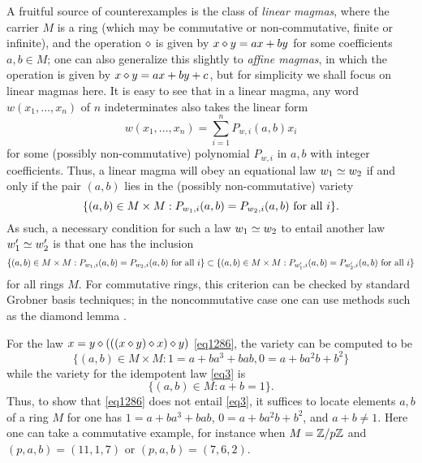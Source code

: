 A fruitful source of counterexamples is the class of \emph{linear magmas}, where the carrier $M$ is a ring (which may be commutative or non-commutative, finite or infinite), and the operation $\diamond$ is given by $x \diamond y = ax + by$ for some coefficients $a,b \in M$; one can also generalize this slightly to \emph{affine magmas}, in which the operation is given by $x \diamond y = ax + by + c$, but for simplicity we shall focus on linear magmas here.  It is easy to see that in a linear magma, any word $w(x_1,\dots,x_n)$ of $n$ indeterminates also takes the linear form
$$ w(x_1,\dots,x_n) = \sum_{i=1}^n P_{w,i}(a,b) x_i$$
for some (possibly non-commutative) polynomial $P_{w,i}$ in $a,b$ with integer coefficients.  Thus, a linear magma will obey an equational law $w_1 \simeq w_2$ if and only if the pair $(a,b)$ lies in the (possibly non-commutative) variety
\begin{equation}\label{variety}
  \{ (a,b) \in M \times M: P_{w_1,i}(a,b) = P_{w_2,i}(a,b) \hbox{ for all } i \}.
\end{equation}
As such, a necessary condition for such a law $w_1 \simeq w_2$ to entail another law $w'_1 \simeq w'_2$ is that one has the inclusion
$$ \{ (a,b) \in M \times M: P_{w_1,i}(a,b) = P_{w_2,i}(a,b) \hbox{ for all } i \} \subset
\{ (a,b) \in M \times M: P_{w'_1,i}(a,b) = P_{w'_2,i}(a,b) \hbox{ for all } i \} $$
for all rings $M$.  For commutative rings, this criterion can be checked by standard Grobner basis techniques; in the noncommutative case one can use methods such as the diamond lemma \cite{diamond-lemma}.

\begin{example}\label{1286-ex} For the law $x = y \diamond (((x \diamond y) \diamond x) \diamond y)$ \eqref{eq1286}, the variety  can be computed to be
$$ \{ (a,b) \in M \times M: 1 = a+ba^3+bab, 0 = a + ba^2 b + b^2 \}$$
while the variety for the idempotent law \eqref{eq3} is
$$ \{ (a,b) \in M: a+b=1 \}.$$
Thus, to show that \eqref{eq1286} does not entail \eqref{eq3}, it suffices to locate elements $a,b$ of a ring $M$ for one has $1 = a+ba^3+bab$, $0 = a + ba^2 b + b^2$, and $a+b \neq 1$.  Here one can take a commutative example, for instance when $M = \mathbb{Z}/p\mathbb{Z}$ and $(p,a,b) = (11,1,7)$ or $(p,a,b)=(7,6,2)$.
\end{example}

